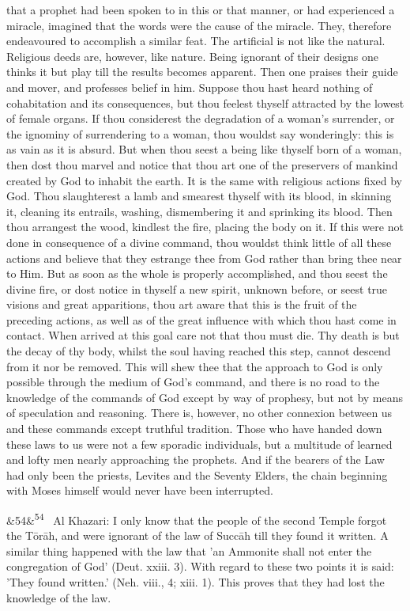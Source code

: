 \documentclass[12pt]{article}
\newcommand{\para}[1][]{\par\noindent\ifx&#1&\else\textsuperscript{\footnotesize #1}~\fi}
\begin{document}
that a prophet had been spoken to in this or that manner, or had experienced a miracle, imagined that the words were the cause of the miracle. They, therefore endeavoured to accomplish a similar feat. The artificial is not like the natural. Religious deeds are, however, like nature. Being ignorant of their designs one thinks it but play till the results becomes apparent. Then one praises their guide and mover, and professes belief in him. Suppose thou hast heard nothing of cohabitation and its consequences, but thou feelest thyself attracted by the lowest of female organs. If thou considerest the degradation of a woman's surrender, or the ignominy of surrendering to a woman, thou wouldst say wonderingly: this is as vain as it is absurd. But when thou seest a being like thyself born of a woman, then dost thou marvel and notice that thou art one of the preservers of mankind created by God to inhabit the earth. It is the same with religious actions fixed by God. Thou slaughterest a lamb and smearest thyself with its blood, in skinning it, cleaning its entrails, washing, dismembering it and sprinking its blood. Then thou arrangest the wood, kindlest the fire, placing the body on it. If this were not done in consequence of a divine command, thou wouldst think little of all these actions and believe that they estrange thee from God rather than bring thee near to Him. But as soon as the whole is properly accomplished, and thou seest the divine fire, or dost notice in thyself a new spirit, unknown before, or seest true visions and great apparitions, thou art aware that this is the fruit of the preceding actions, as well as of the great influence with which thou hast come in contact. When arrived at this goal care not that thou must die. Thy death is but the decay of thy body, whilst the soul having reached this step, cannot descend from it nor be removed. This will shew thee that the approach to God is only possible through the medium of God's command, and there is no road to the knowledge of the commands of God except by way of prophesy, but not by means of speculation and reasoning. There is, however, no other connexion between us and these commands except truthful tradition. Those who have handed down these laws to us were not a few sporadic individuals, but a multitude of learned and lofty men nearly approaching the prophets. And if the bearers of the Law had only been the priests, Levites and the Seventy Elders, the chain beginning with Moses himself would never have been interrupted.

\para[54] Al Khazari: I only know that the people of the second Temple forgot the Tōrāh, and were ignorant of the law of Succāh till they found it written. A similar thing happened with the law that 'an Ammonite shall not enter the congregation of God' (Deut. xxiii. 3). With regard to these two points it is said: 'They found written.' (Neh. viii., 4; xiii. 1). This proves that they had lost the knowledge of the law.
\end{document}
